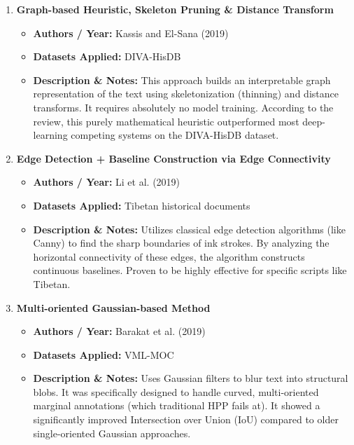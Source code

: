 \documentclass{article}
\begin{document}
\begin{enumerate}[label=\textbf{\arabic*.}]
    
    \item \textbf{Graph-based Heuristic, Skeleton Pruning \& Distance Transform}
    \begin{itemize}
        \item \textbf{Authors / Year:} Kassis and El-Sana (2019)
        \item \textbf{Datasets Applied:} DIVA-HisDB
        \item \textbf{Description \& Notes:} This approach builds an interpretable graph representation of the text using skeletonization (thinning) and distance transforms. It requires absolutely no model training. According to the review, this purely mathematical heuristic outperformed most deep-learning competing systems on the DIVA-HisDB dataset.
    \end{itemize}

    \item \textbf{Edge Detection + Baseline Construction via Edge Connectivity}
    \begin{itemize}
        \item \textbf{Authors / Year:} Li et al. (2019)
        \item \textbf{Datasets Applied:} Tibetan historical documents
        \item \textbf{Description \& Notes:} Utilizes classical edge detection algorithms (like Canny) to find the sharp boundaries of ink strokes. By analyzing the horizontal connectivity of these edges, the algorithm constructs continuous baselines. Proven to be highly effective for specific scripts like Tibetan.
    \end{itemize}

    \item \textbf{Multi-oriented Gaussian-based Method}
    \begin{itemize}
        \item \textbf{Authors / Year:} Barakat et al. (2019)
        \item \textbf{Datasets Applied:} VML-MOC
        \item \textbf{Description \& Notes:} Uses Gaussian filters to blur text into structural blobs. It was specifically designed to handle curved, multi-oriented marginal annotations (which traditional HPP fails at). It showed a significantly improved Intersection over Union (IoU) compared to older single-oriented Gaussian approaches.
    \end{itemize}


\end{enumerate}
\end{document}
